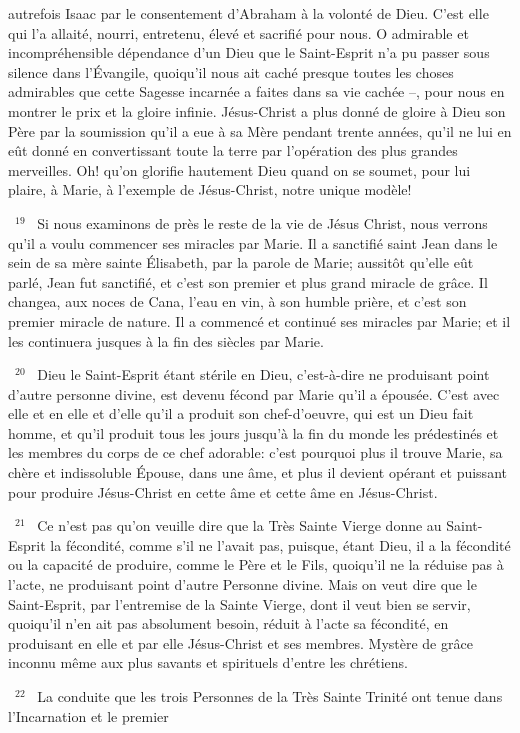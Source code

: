 \documentclass[paper=a5,pagesize=pdftex,fontsize=15pt,headinclude=on,twoside=off]{scrbook}
\newcommand{\negphantom}[1]{\settowidth{\dimen0}{#1}\hspace*{-\dimen0}}
\newcommand{\versenb}[1]{\par \vspace{10pt}~\negphantom{~${}^{#1}$~}${}^{#1}$~}
\begin{document}
autrefois Isaac par le consentement d'Abraham à la volonté de Dieu. C'est elle qui l'a allaité, nourri, entretenu,
élevé et sacrifié pour nous.
O admirable et incompréhensible dépendance d'un Dieu que le Saint-Esprit n'a pu passer sous silence dans
l'Évangile, quoiqu'il nous ait caché presque toutes les choses admirables que cette Sagesse incarnée a faites dans
sa vie cachée --, pour nous en montrer le prix et la gloire infinie. Jésus-Christ a plus donné de gloire à Dieu son
Père par la soumission qu'il a eue à sa Mère pendant trente années, qu'il ne lui en eût donné en convertissant
toute la terre par l'opération des plus grandes merveilles. Oh! qu'on glorifie hautement Dieu quand on se soumet,
pour lui plaire, à Marie, à l'exemple de Jésus-Christ, notre unique modèle!
\versenb{19} Si nous examinons de près le reste de la vie de Jésus Christ, nous verrons qu'il a voulu commencer ses
miracles par Marie. Il a sanctifié saint Jean dans le sein de sa mère sainte Élisabeth, par la parole de Marie;
aussitôt qu'elle eût parlé, Jean fut sanctifié, et c'est son premier et plus grand miracle de grâce. Il changea, aux
noces de Cana, l'eau en vin, à son humble prière, et c'est son premier miracle de nature. Il a commencé et
continué ses miracles par Marie; et il les continuera jusques à la fin des siècles par Marie.
\versenb{20} Dieu le Saint-Esprit étant stérile en Dieu, c'est-à-dire ne produisant point d'autre personne divine, est devenu
fécond par Marie qu'il a épousée. C'est avec elle et en elle et d'elle qu'il a produit son chef-d'oeuvre, qui est un
Dieu fait homme, et qu'il produit tous les jours jusqu'à la fin du monde les prédestinés et les membres du corps de
ce chef adorable: c'est pourquoi plus il trouve Marie, sa chère et indissoluble Épouse, dans une âme, et plus il
devient opérant et puissant pour produire Jésus-Christ en cette âme et cette âme en Jésus-Christ.
\versenb{21} Ce n'est pas qu'on veuille dire que la Très Sainte Vierge donne au Saint-Esprit la fécondité, comme s'il ne
l'avait pas, puisque, étant Dieu, il a la fécondité ou la capacité de produire, comme le Père et le Fils, quoiqu'il ne la
réduise pas à l'acte, ne produisant point d'autre Personne divine. Mais on veut dire que le Saint-Esprit, par
l'entremise de la Sainte Vierge, dont il veut bien se servir, quoiqu'il n'en ait pas absolument besoin, réduit à l'acte
sa fécondité, en produisant en elle et par elle Jésus-Christ et ses membres. Mystère de grâce inconnu même aux
plus savants et spirituels d'entre les chrétiens.
\versenb{22} La conduite que les trois Personnes de la Très Sainte Trinité ont tenue dans l'Incarnation et le premier
\end{document}
